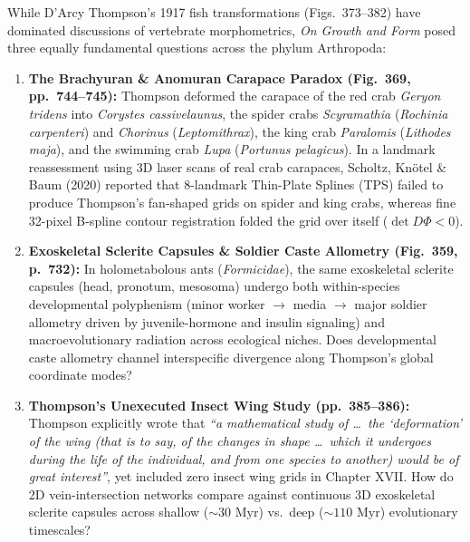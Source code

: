 \documentclass[10pt,twocolumn]{article}
\begin{document}
While D'Arcy Thompson's 1917 fish transformations (Figs.~373--382) have dominated discussions of vertebrate morphometrics, \emph{On Growth and Form} posed three equally fundamental questions across the phylum Arthropoda:
\begin{enumerate}
  \item \textbf{The Brachyuran \& Anomuran Carapace Paradox (Fig.~369, pp.~744--745):} Thompson deformed the carapace of the red crab \emph{Geryon tridens} into \emph{Corystes cassivelaunus}, the spider crabs \emph{Scyramathia} (\emph{Rochinia carpenteri}) and \emph{Chorinus} (\emph{Leptomithrax}), the king crab \emph{Paralomis} (\emph{Lithodes maja}), and the swimming crab \emph{Lupa} (\emph{Portunus pelagicus}). In a landmark reassessment using 3D laser scans of real crab carapaces, Scholtz, Kn\"otel \& Baum (2020) reported that 8-landmark Thin-Plate Splines (TPS) failed to produce Thompson's fan-shaped grids on spider and king crabs, whereas fine 32-pixel B-spline contour registration folded the grid over itself ($\det D\Phi < 0$).
  \item \textbf{Exoskeletal Sclerite Capsules \& Soldier Caste Allometry (Fig.~359, p.~732):} In holometabolous ants (\emph{Formicidae}), the same exoskeletal sclerite capsules (head, pronotum, mesosoma) undergo both within-species developmental polyphenism (minor worker $\to$ media $\to$ major soldier allometry driven by juvenile-hormone and insulin signaling) and macroevolutionary radiation across ecological niches. Does developmental caste allometry channel interspecific divergence along Thompson's global coordinate modes?
  \item \textbf{Thompson's Unexecuted Insect Wing Study (pp.~385--386):} Thompson explicitly wrote that \emph{``a mathematical study of \dots\ the `deformation' of the wing (that is to say, of the changes in shape \dots\ which it undergoes during the life of the individual, and from one species to another) would be of great interest''}, yet included zero insect wing grids in Chapter XVII. How do 2D vein-intersection networks compare against continuous 3D exoskeletal sclerite capsules across shallow ($\sim 30\text{ Myr}$) vs.\ deep ($\sim 110\text{ Myr}$) evolutionary timescales?
\end{enumerate}
\end{document}
